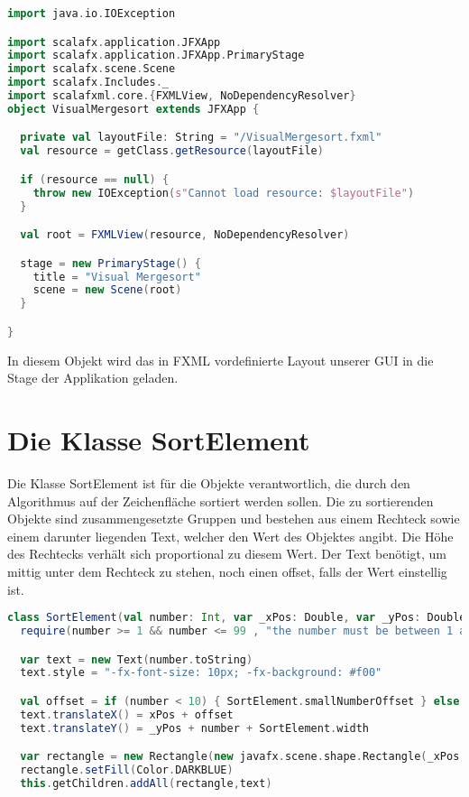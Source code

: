 \begin{lstlisting}[language=Scala]
import java.io.IOException

import scalafx.application.JFXApp
import scalafx.application.JFXApp.PrimaryStage
import scalafx.scene.Scene
import scalafx.Includes._
import scalafxml.core.{FXMLView, NoDependencyResolver}
object VisualMergesort extends JFXApp {

  private val layoutFile: String = "/VisualMergesort.fxml"
  val resource = getClass.getResource(layoutFile)

  if (resource == null) {
    throw new IOException(s"Cannot load resource: $layoutFile")
  }

  val root = FXMLView(resource, NoDependencyResolver)

  stage = new PrimaryStage() {
    title = "Visual Mergesort"
    scene = new Scene(root)
  }

}
\end{lstlisting}

In diesem Objekt wird das in FXML vordefinierte Layout unserer GUI in die Stage der Applikation geladen.

\section{Die Klasse SortElement}
Die Klasse SortElement ist für die Objekte verantwortlich, die durch den Algorithmus auf der Zeichenfläche sortiert werden sollen. Die zu sortierenden Objekte sind zusammengesetzte Gruppen und bestehen aus einem Rechteck sowie einem darunter liegenden Text, welcher den Wert des Objektes angibt. Die Höhe des Rechtecks verhält sich proportional zu diesem Wert.
Der Text benötigt, um mittig unter dem Rechteck zu stehen, noch einen offset, falls der Wert einstellig ist.

\begin{lstlisting}[language=Scala]
class SortElement(val number: Int, var _xPos: Double, var _yPos: Double) extends Group with Ordered[SortElement]  {
  require(number >= 1 && number <= 99 , "the number must be between 1 and 99 (inclusive)")

  var text = new Text(number.toString)
  text.style = "-fx-font-size: 10px; -fx-background: #f00"

  val offset = if (number < 10) { SortElement.smallNumberOffset } else { 0 }
  text.translateX() = xPos + offset
  text.translateY() = _yPos + number + SortElement.width

  var rectangle = new Rectangle(new javafx.scene.shape.Rectangle(_xPos, _yPos, SortElement.width, number))
  rectangle.setFill(Color.DARKBLUE)
  this.getChildren.addAll(rectangle,text)
\end{lstlisting}

